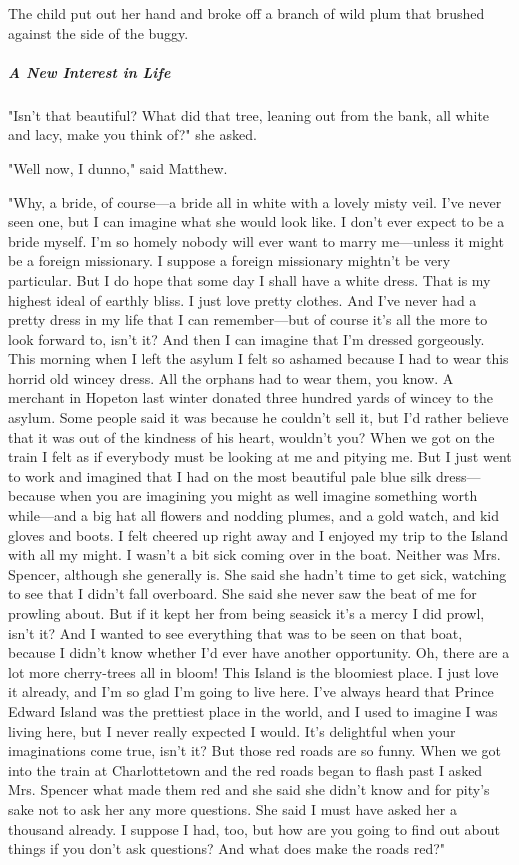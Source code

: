 \documentclass{article}
\begin{document}
The child put out her hand and broke off a branch of wild plum that brushed against the side of the buggy.

\subparagraph{A New Interest in Life}
"Isn't that beautiful? What did that tree, leaning out from the bank, all white and lacy, make you think of?" she asked.

"Well now, I dunno," said Matthew.

"Why, a bride, of course---a bride all in white with a lovely misty veil. I've never seen one, but I can imagine what she would look like. I don't ever expect to be a bride myself. I'm so homely nobody will ever want to marry me---unless it might be a foreign missionary. I suppose a foreign missionary mightn't be very particular. But I do hope that some day I shall have a white dress. That is my highest ideal of earthly bliss. I just love pretty clothes. And I've never had a pretty dress in my life that I can remember---but of course it's all the more to look forward to, isn't it? And then I can imagine that I'm dressed gorgeously. This morning when I left the asylum I felt so ashamed because I had to wear this horrid old wincey dress. All the orphans had to wear them, you know. A merchant in Hopeton last winter donated three hundred yards of wincey to the asylum. Some people said it was because he couldn't sell it, but I'd rather believe that it was out of the kindness of his heart, wouldn't you? When we got on the train I felt as if everybody must be looking at me and pitying me. But I just went to work and imagined that I had on the most beautiful pale blue silk dress---because when you are imagining you might as well imagine something worth while---and a big hat all flowers and nodding plumes, and a gold watch, and kid gloves and boots. I felt cheered up right away and I enjoyed my trip to the Island with all my might. I wasn't a bit sick coming over in the boat. Neither was Mrs. Spencer, although she generally is. She said she hadn't time to get sick, watching to see that I didn't fall overboard. She said she never saw the beat of me for prowling about. But if it kept her from being seasick it's a mercy I did prowl, isn't it? And I wanted to see everything that was to be seen on that boat, because I didn't know whether I'd ever have another opportunity. Oh, there are a lot more cherry-trees all in bloom! This Island is the bloomiest place. I just love it already, and I'm so glad I'm going to live here. I've always heard that Prince Edward Island was the prettiest place in the world, and I used to imagine I was living here, but I never really expected I would. It's delightful when your imaginations come true, isn't it? But those red roads are so funny. When we got into the train at Charlottetown and the red roads began to flash past I asked Mrs. Spencer what made them red and she said she didn't know and for pity's sake not to ask her any more questions. She said I must have asked her a thousand already. I suppose I had, too, but how are you going to find out about things if you don't ask questions? And what does make the roads red?"
\end{document}
